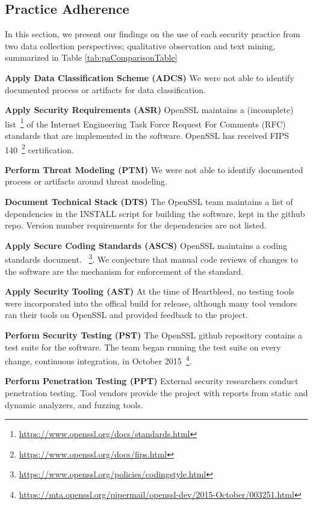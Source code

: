 \subsection{Practice Adherence}
In this section, we present our findings on the use of each security practice from two data collection perspectives; qualitative observation and text mining, summarized in Table \ref{tab:paComparisonTable}

\textbf{Apply Data Classification Scheme (ADCS)}
We were not able to identify documented process or artifacts for data classification.

\textbf{Apply Security Requirements (ASR)}
OpenSSL maintains a (incomplete) list~\footnote{\url{https://www.openssl.org/docs/standards.html}} of the Internet Engineering Task Force Request For Comments (RFC) standards that are implemented in the software.  OpenSSL has received FIPS 140~\footnote{\url{https://www.openssl.org/docs/fips.html}} certification.

\textbf{Perform Threat Modeling (PTM)}
We were not able to identify documented process or artifacts around threat modeling.

\textbf{Document Technical Stack (DTS)}
The OpenSSL team maintains a list of dependencies in the INSTALL script for building the software, kept in the github repo. Version number requirements for the dependencies are not listed.

\textbf{Apply Secure Coding Standards (ASCS)}
OpenSSL maintains a coding standards document. ~\footnote{\url{https://www.openssl.org/policies/codingstyle.html}}. We conjecture that manual code reviews of changes to the software are the mechanism for enforcement of the standard.

\textbf{Apply Security Tooling (AST)}
At the time of Heartbleed, no testing tools were incorporated into the offical build for release, although many tool vendors ran their tools on OpenSSL and provided feedback to the project. 

\textbf{Perform Security Testing (PST)}
The OpenSSL github repository contains a test suite for the software. The team began running the test suite on every change, continuous integration, in October 2015~\footnote{\url{https://mta.openssl.org/pipermail/openssl-dev/2015-October/003251.html}}.

\textbf{Perform Penetration Testing (PPT)}
External security researchers conduct penetration testing. Tool vendors provide the project with reports from static and dynamic analyzers, and fuzzing tools. 

